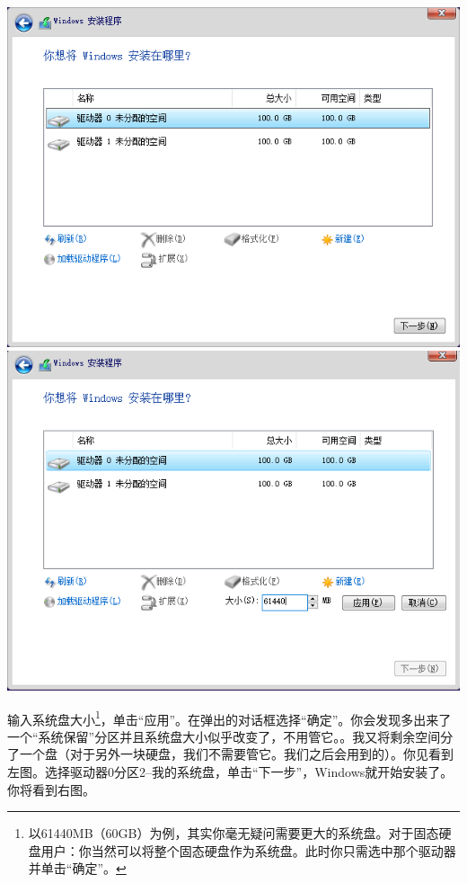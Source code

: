 \begin{center}
	\includegraphics[scale=0.45]{pic/win10setup4}	\includegraphics[scale=0.45]{pic/win10setup5}
\end{center} \par
输入系统盘大小\footnote{以61440MB（60GB）为例，其实你毫无疑问需要更大的系统盘。对于固态硬盘用户：你当然可以将整个固态硬盘作为系统盘。此时你只需选中那个驱动器并单击“确定”。}，单击“应用”。在弹出的对话框选择“确定”。你会发现多出来了一个“系统保留”分区并且系统盘大小似乎改变了，不用管它。{\color{red}{这里演示的是老型号机器：BIOS-Legacy的主板，设置使用主启动记录（MBR）的分区表格式安装。使用BIOS-UEFI安装过程大体相同，只是分区上多了“恢复”“系统分区”“MSR（保留）”“主分区”，你需要在“主分区”安装它。}}。我又将剩余空间分了一个盘（对于另外一块硬盘，我们不需要管它。我们之后会用到的）。你见看到左图。选择驱动器0分区2--我的系统盘{\color{red}{（注意！重要！别选错了！）}}，单击“下一步”，Windows就开始安装了。你将看到右图。
